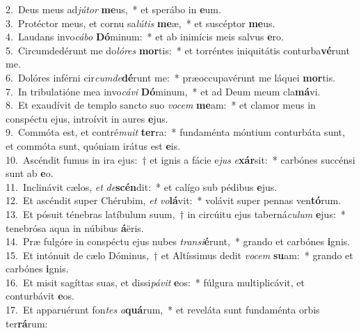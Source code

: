 {2.~}Deus meus ad\textit{jú}\textit{tor} \textbf{me}us,~* et sperábo in \textbf{e}um.\\
{3.~}Protéctor meus, et cornu sa\textit{lú}\textit{tis} \textbf{me}æ,~* et suscéptor \textbf{me}us.\\
{4.~}Laudans invo\textit{cá}\textit{bo} \textbf{Dó}minum:~* et ab inimícis meis salvus \textbf{e}ro.\\
{5.~}Circumdedérunt me do\textit{ló}\textit{res} \textbf{mor}tis:~* et torréntes iniquitátis conturba\textbf{vé}runt me.\\
{6.~}Dolóres inférni cir\textit{cum}\textit{de}\textbf{dé}runt me:~* præoccupavérunt me láquei \textbf{mor}tis.\\
{7.~}In tribulatióne mea invo\textit{cá}\textit{vi} \textbf{Dó}minum,~* et ad Deum meum cla\textbf{má}vi.\\
{8.~}Et exaudívit de templo sancto suo \textit{vo}\textit{cem} \textbf{me}am:~* et clamor meus in conspéctu ejus, introívit in aures \textbf{e}jus.\\
{9.~}Commóta est, et contré\textit{mu}\textit{it} \textbf{ter}ra:~* fundaménta móntium conturbáta sunt, et commóta sunt, quóniam irátus est \textbf{e}is.\\
{10.~}Ascéndit fumus in ira ejus:~† et ignis a fácie e\textit{jus} \textit{e}\textbf{xár}sit:~* carbónes succénsi sunt ab \textbf{e}o.\\
{11.~}Inclinávit cælos, \textit{et} \textit{de}\textbf{scén}dit:~* et calígo sub pédibus \textbf{e}jus.\\
{12.~}Et ascéndit super Chérubim, \textit{et} \textit{vo}\textbf{lá}vit:~* volávit super pennas ven\textbf{tó}rum.\\
{13.~}Et pósuit ténebras latíbulum suum,~† in circúitu ejus taberná\textit{cu}\textit{lum} \textbf{e}jus:~* tenebrósa aqua in núbibus \textbf{á}ëris.\\
{14.~}Præ fulgóre in conspéctu ejus nubes \textit{tran}\textit{si}\textbf{é}runt,~* grando et carbónes \textbf{i}gnis.\\
{15.~}Et intónuit de cælo Dóminus,~† et Altíssimus dedit \textit{vo}\textit{cem} \textbf{su}am:~* grando et carbónes \textbf{i}gnis.\\
{16.~}Et misit sagíttas suas, et dissi\textit{pá}\textit{vit} \textbf{e}os:~* fúlgura multiplicávit, et conturbávit \textbf{e}os.\\
{17.~}Et apparuérunt fon\textit{tes} \textit{a}\textbf{quá}rum,~* et reveláta sunt fundaménta orbis ter\textbf{rá}rum:\\
